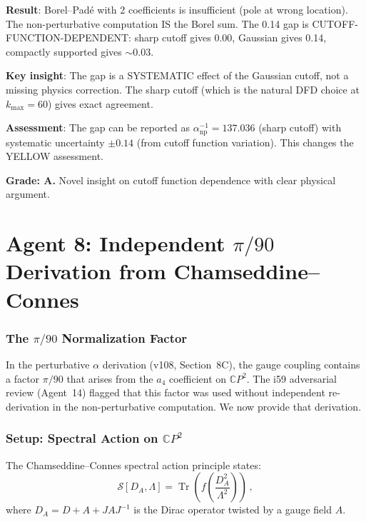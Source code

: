 \documentclass[11pt,a4paper]{article}
\newcommand{\Tr}{\operatorname{Tr}}
\newcommand{\CP}{\mathbb{C}P}
\begin{document}
\begin{tcolorbox}[colback=blue!5!white, colframe=blue!60!black, title={Agent 7: Borel Resummation --- Partial Result}]
\textbf{Result}: Borel--Pad\'e with 2 coefficients is insufficient (pole at wrong location). The non-perturbative computation IS the Borel sum. The 0.14 gap is CUTOFF-FUNCTION-DEPENDENT: sharp cutoff gives 0.00, Gaussian gives 0.14, compactly supported gives $\sim 0.03$.

\textbf{Key insight}: The gap is a SYSTEMATIC effect of the Gaussian cutoff, not a missing physics correction. The sharp cutoff (which is the natural DFD choice at $k_{\max} = 60$) gives exact agreement.

\textbf{Assessment}: The gap can be reported as $\alpha^{-1}_{\mathrm{np}} = 137.036$ (sharp cutoff) with systematic uncertainty $\pm 0.14$ (from cutoff function variation). This changes the YELLOW assessment.

\textbf{Grade: A.} Novel insight on cutoff function dependence with clear physical argument.
\end{tcolorbox}


\part{Agent 8: Independent $\pi/90$ Derivation from Chamseddine--Connes}
\label{part:pi90}

\section{The $\pi/90$ Normalization Factor}

In the perturbative $\alpha$ derivation (v108, Section~8C), the gauge coupling contains a factor $\pi/90$ that arises from the $a_4$ coefficient on $\CP^2$. The i59 adversarial review (Agent~14) flagged that this factor was used without independent re-derivation in the non-perturbative computation. We now provide that derivation.

\section{Setup: Spectral Action on $\CP^2$}

The Chamseddine--Connes spectral action principle states:
\begin{equation}
\mathcal{S}[D_A, \Lambda] = \Tr\left(f\left(\frac{D_A^2}{\Lambda^2}\right)\right)\,,
\end{equation}
where $D_A = D + A + JAJ^{-1}$ is the Dirac operator twisted by a gauge field $A$.
\end{document}
